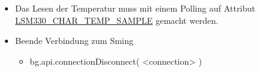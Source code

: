 \begin{itemize}
\begin{itemize}
	\item Das Lesen der Temperatur muss mit einem Polling auf Attribut \url{LSM330_CHAR_TEMP_SAMPLE} gemacht werden.

	\item Beende Verbindung zum Sming
			\begin{itemize}
				\itemsep 1pt \parskip 0pt \parsep 0pt
				\item bg.api.connectionDisconnect( <connection> )
			\end{itemize}
	\end{itemize}
\end{itemize}
